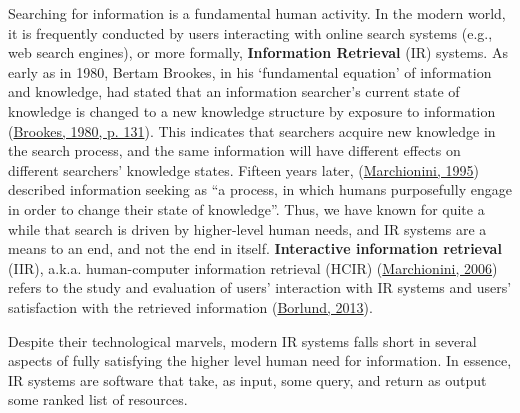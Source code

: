 \documentclass[a4paper, nobind]{templates/ociamthesis}
\begin{document}
Searching for information is a fundamental human activity.
In the modern world, it is frequently conducted by users interacting with online
search systems (e.g., web search engines), or more formally,
\textbf{Information Retrieval} (IR) systems. As early as in 1980, Bertam
Brookes, in his `fundamental equation' of information and knowledge, had
stated that an information searcher's current state of knowledge is
changed to a new knowledge structure by exposure to information
(\protect\hyperlink{ref-brookes1980foundations}{Brookes, 1980, p. 131}). This indicates that searchers acquire
new knowledge in the search process, and the same information will have
different effects on different searchers' knowledge states. Fifteen
years later, (\protect\hyperlink{ref-marchionini1995information}{Marchionini, 1995}) described information seeking
as ``a process, in which humans purposefully engage in order to change
their state of knowledge''. Thus, we have known for quite a while that
search is driven by higher-level human needs, and IR systems are a means
to an end, and not the end in itself. \textbf{Interactive information
retrieval} (IIR), a.k.a. human-computer information retrieval (HCIR)
(\protect\hyperlink{ref-marchionini2006toward}{Marchionini, 2006}) refers to the study and evaluation of users'
interaction with IR systems and users' satisfaction with the retrieved
information (\protect\hyperlink{ref-borlund2013interactive}{Borlund, 2013}).

Despite their technological marvels, modern IR systems falls short in
several aspects of fully satisfying the higher level human need for
information. In essence, IR systems are software that take, as input,
some query, and return as output some ranked list of resources.
\end{document}
